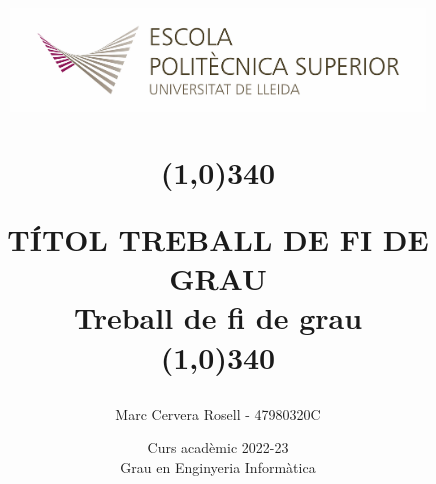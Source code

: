 \title{
	\begin{center}
	\vspace{3cm}
	\includegraphics[width=11cm, height=3cm]{images/Logo-nou-eps.jpg}
	\end{center}
	\begin{center}
	\line(1,0){340}
	\end{center}		
	TÍTOL TREBALL DE FI DE GRAU\\
	\vspace{2mm}
	\Large Treball de fi de grau\\
	\line(1,0){340}
	\vspace{2.5cm}
	}

\author{Marc Cervera Rosell - 47980320C \vspace{1cm}}


\date{Curs acadèmic 2022-23\vspace{0.5cm} \\Grau en Enginyeria Informàtica}
